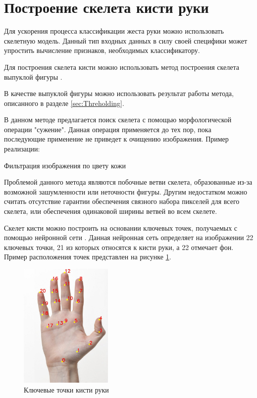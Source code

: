 \section{Построение скелета кисти руки}
\label{sec:Skeleton}

Для ускорения процесса классификации жеста руки можно использовать скелетную модель. Данный тип входных данных в силу своей специфики может упростить вычисление признаков, необходимых классификатору.

Для построения скелета кисти можно использовать метод построения скелета выпуклой фигуры \cite{DIP}. 

В качестве выпуклой фигуры можно использовать результат работы метода, описанного в разделе \ref{sec:Threholding}.

В данном методе предлагается поиск скелета с помощью морфологической операции "сужение". Данная операция применяется до тех пор, пока последующие применение не приведет к очищению изображения. Пример реализации:

\begin{minipage}{0.75\textwidth}
	\begin{algorithm}[H]
		
		\caption{Фильтрация изображения по цвету кожи}
		\label{imp:ske-opencv}
	\end{algorithm}
\end{minipage}

Проблемой данного метода являются побочные ветви скелета, образованные из-за возможной зашумленности или неточности фигуры. Другим недостатком можно считать отсутствие гарантии обеспечения связного набора пикселей для всего скелета, или обеспечения одинаковой ширины ветвей во всем скелете.

Скелет кисти можно построить на основании ключевых точек, получаемых с помощью нейронной сети \cite{DNN}. Данная нейронная сеть определяет на изображении 22 ключевых точки, 21 из которых относятся к кисти руки, а 22 отмечает фон. Пример расположения точек представлен на рисунке \ref{fig:keypoints}.

\begin{figure}[!h]
	\centering
	\includegraphics[width=0.4\textwidth,keepaspectratio]{figures/ru/handpose-demo-keypoints}
	\caption{Ключевые точки кисти руки}
	\label{fig:keypoints}
\end{figure}

